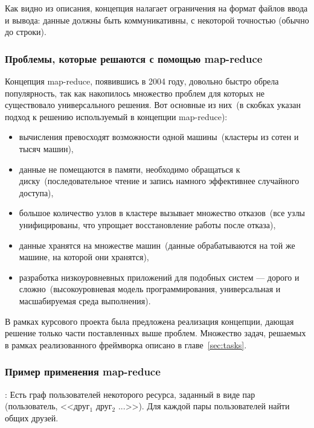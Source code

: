 \documentclass[12pt,a4paper,oneside]{extarticle}
\begin{document}
        Как видно из описания, концепция налагает ограничения на формат файлов ввода и вывода: данные должны быть коммуникативны, с некоторой точностью (обычно до строки).
    \clearpage

        \subsubsection{Проблемы, которые решаются с помощью map-reduce}
            Концепция map-reduce, появившись в 2004 году, довольно быстро обрела популярность, так как накопилось множество проблем для которых не существовало универсального решения. Вот основные из них~(в скобках указан подход к решению используемый в концепции map-reduce):

            \begin{itemize}
                \item вычисления превосходят возможности одной машины~(кластеры из сотен и тысяч машин),
                \item данные не помещаются в памяти, необходимо обращаться к диску~(последовательное чтение и запись намного эффективнее случайного доступа),
                \item большое количество узлов в кластере вызывает множество отказов~(все узлы унифицированы, что упрощает восстановление работы после отказа),
                \item данные хранятся на множестве машин~(данные обрабатываются на той же машине, на которой они хранятся),
                \item разработка низкоуровневных приложений для подобных систем --- дорого и сложно~(высокоуровневая модель программирования, универсальная и масшабируемая среда выполнения).
            \end{itemize} 

            В рамках курсового проекта была предложена реализация концепции, дающая решение только части поставленных выше проблем. Множество задач, решаемых в рамках реализованного фреймворка описано в главе~\ref{sec:tasks}.

        \subsubsection{Пример применения map-reduce}

            {:} Есть граф пользователей некоторого ресурса, заданный в виде пар (пользователь, <<друг$_1$ друг$_2$ ...>>). Для каждой пары пользователей найти общих друзей.
\end{document}

